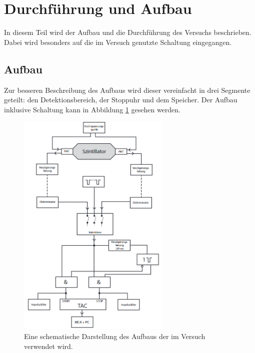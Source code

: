 \newpage
\section{Durchführung und Aufbau}
\label{sec:durchfuerung}
In diesem Teil wird der Aufbau und die Durchführung des Versuchs beschrieben.
Dabei wird besonders auf die im Versuch genutzte Schaltung eingegangen.
\FloatBarrier
\subsection{Aufbau}
Zur besseren Beschreibung des Aufbaus wird dieser vereinfacht in drei Segmente geteilt: den Detektionsbereich, der Stoppuhr und dem Speicher.
Der Aufbau inklusive Schaltung kann in Abbildung \ref{fig:aufbau} gesehen werden.
\begin{figure}
    \centering
    \includegraphics[width=0.65\textwidth]{data/aufbau.png}
    \caption{Eine schematische Darstellung des Aufbaus der im Versuch verwendet wird. \cite{V01}}
    \label{fig:aufbau}
\end{figure}
\FloatBarrier

